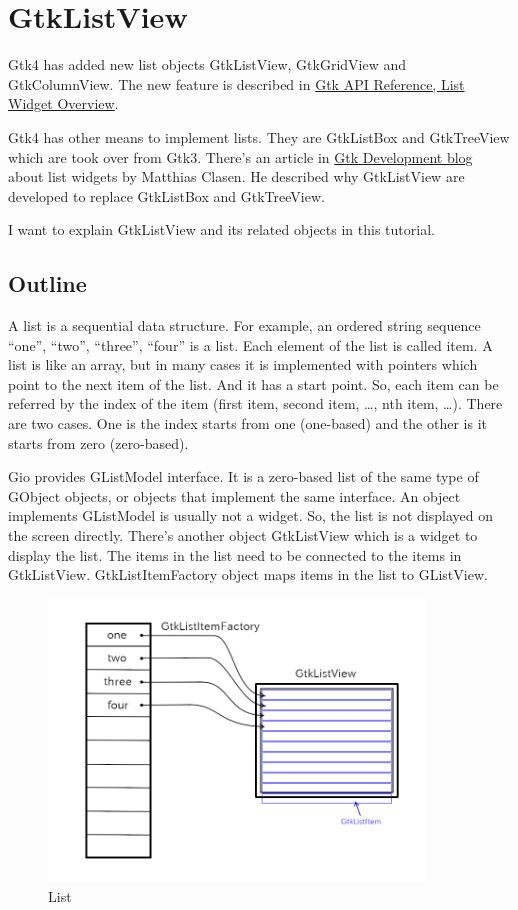 \hypertarget{gtklistview}{%
\section{GtkListView}\label{gtklistview}}

Gtk4 has added new list objects GtkListView, GtkGridView and
GtkColumnView. The new feature is described in
\href{https://docs.gtk.org/gtk4/section-list-widget.html}{Gtk API
Reference, List Widget Overview}.

Gtk4 has other means to implement lists. They are GtkListBox and
GtkTreeView which are took over from Gtk3. There's an article in
\href{https://blog.gtk.org/2020/06/07/scalable-lists-in-gtk-4/}{Gtk
Development blog} about list widgets by Matthias Clasen. He described
why GtkListView are developed to replace GtkListBox and GtkTreeView.

I want to explain GtkListView and its related objects in this tutorial.

\hypertarget{outline}{%
\subsection{Outline}\label{outline}}

A list is a sequential data structure. For example, an ordered string
sequence ``one'', ``two'', ``three'', ``four'' is a list. Each element
of the list is called item. A list is like an array, but in many cases
it is implemented with pointers which point to the next item of the
list. And it has a start point. So, each item can be referred by the
index of the item (first item, second item, \ldots, nth item, \ldots).
There are two cases. One is the index starts from one (one-based) and
the other is it starts from zero (zero-based).

Gio provides GListModel interface. It is a zero-based list of the same
type of GObject objects, or objects that implement the same interface.
An object implements GListModel is usually not a widget. So, the list is
not displayed on the screen directly. There's another object GtkListView
which is a widget to display the list. The items in the list need to be
connected to the items in GtkListView. GtkListItemFactory object maps
items in the list to GListView.

\begin{figure}
\centering
\includegraphics[width=10cm,height=7.5cm]{../image/list.png}
\caption{List}
\end{figure}

